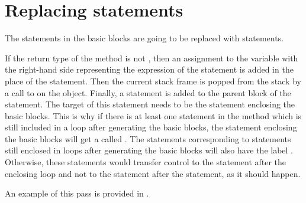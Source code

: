 \section{Replacing  statements}

The  statements in the basic blocks are going to be replaced with  statements.

If the return type of the method is not , then an assignment to the  variable with the right-hand side
representing the expression of the  statement is added in the place of the  statement. Then the
current stack frame is popped from the stack by a call to  on the  object. Finally, a
 statement is added to the parent block of the  statement. The target of this 
statement needs to be the  statement enclosing the basic blocks. This is why if there is at least one
 statement in the method which is still included in a loop after generating the basic blocks, the
 statement enclosing the basic blocks will get a  called . The 
statements corresponding to  statements still enclosed in loops after generating the basic blocks will also
have the label . Otherwise, these  statements would transfer control to the statement after
the enclosing loop and not to the statement after the  statement, as it should happen.

An example of this pass is provided in .

